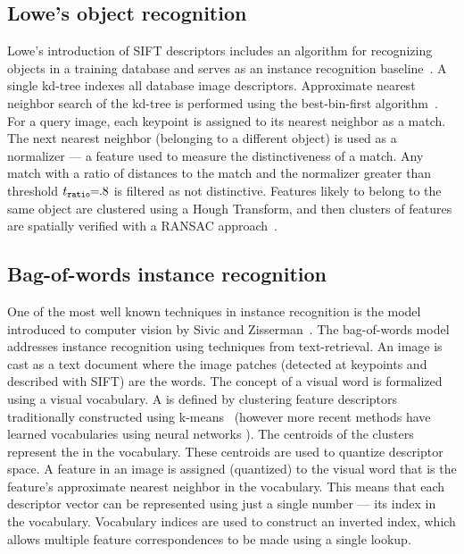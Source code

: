         \figSVInlier{}


    \subsection{Lowe's object recognition}

        Lowe's introduction of SIFT descriptors includes an algorithm for recognizing objects in a training
        database and serves as an instance recognition baseline~\cite{lowe_distinctive_2004}. A single kd-tree
        indexes all database image descriptors. Approximate nearest neighbor search of the kd-tree is performed
        using the best-bin-first algorithm~\cite{beis_shape_1997}. For a query image, each keypoint is assigned to
        its nearest neighbor as a match. The next nearest neighbor (belonging to a different object) is used as a
        normalizer --- a feature used to measure the distinctiveness of a match. Any match with a ratio of
        distances to the match and the normalizer greater than threshold $t_{\tt{ratio}}\mkern-6mu=\mkern-6mu.8$ is filtered as
        not distinctive. Features likely to belong to the same object are clustered using a Hough Transform, and
        then clusters of features are spatially verified with a RANSAC approach~\cite{fischler_random_1981}.


    \subsection{Bag-of-words instance recognition}\label{subsec:bow}

        One of the most well known techniques in instance recognition is the  model
        introduced to computer vision by Sivic and Zisserman~\cite{sivic_video_2003, sivic_efficient_2009}. The
        bag-of-words model addresses instance recognition using techniques from text-retrieval. An image is cast as
        a text document where the image patches (detected at keypoints and described with SIFT) are the words. The
        concept of a visual word is formalized using a visual vocabulary. A  is
        defined by clustering feature descriptors traditionally constructed using k-means~\cite{lloyd_least_1982}
        (however more recent methods have learned vocabularies using neural networks
        \cite{arandjelovic_netvlad_2016}). The centroids of the clusters represent the  in
        the vocabulary. These centroids are used to quantize descriptor space. A feature in an image is assigned
        (quantized) to the visual word that is the feature's approximate nearest neighbor in the vocabulary. This
        means that each descriptor vector can be represented using just a single number --- \ie{} its index in the
        vocabulary. Vocabulary indices are used to construct an inverted index, which allows multiple feature
        correspondences to be made using a single lookup.

